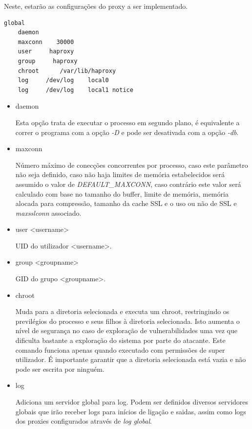 \documentclass[12pt,a4paper]{article}
\begin{document}
Neste, estarão as configurações do proxy a ser implementado.

\begin{verbatim}
global  
    daemon
    maxconn    30000
    user     haproxy
    group     haproxy
    chroot      /var/lib/haproxy
    log     /dev/log    local0
    log     /dev/log    local1 notice

\end{verbatim}

\begin{itemize}
    \item daemon

Esta opção trata de executar o processo em segundo plano, é equivalente a correr o programa com a opção \emph{-D} e pode ser desativada com a opção \emph{-db}.

    \item maxconn
    
Número máximo de conecções concorrentes por processo, caso este parâmetro não seja definido, caso não haja limites de memória estabelecidos será assumido o valor de \emph{DEFAULT\_MAXCONN}, caso contrário este valor será calculado com base no tamanho do buffer, limite de memória, memória alocada para compressão, tamanho da cache SSL e o uso ou não de SSL e \emph{maxsslconn} associado.

    \item user <username>
    
UID do utilizador <username>.

    \item group <groupname>
    
GID do grupo <groupname>.

    \item chroot
    
Muda para a diretoria selecionada e executa um chroot, restringindo os previlégios do processo e seus filhos à diretoria selecionada. Isto aumenta o nível de segurança no caso de exploração de vulnerabilidades uma vez que dificulta bastante a exploração do sistema por parte do atacante. Este comando funciona apenas quando executado com permissões de super utilizador. É importante garantir que a diretoria selecionada está vazia e não pode ser escrita por ninguém.

    \item log
    
Adiciona um servidor global para log. Podem ser definidos diversos servidores globais que irão receber logs para inícios de ligação e saidas, assim como logs dos proxies configurados através de \emph{log global}.

\end{itemize}
\end{document}
